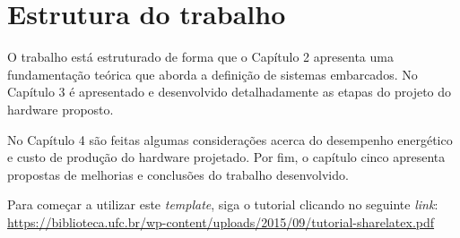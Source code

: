 \section{Estrutura do trabalho}

O trabalho está estruturado de forma que o Capítulo 2 apresenta uma fundamentação teórica que aborda a definição de sistemas embarcados. No Capítulo 3 é apresentado e desenvolvido detalhadamente as etapas do projeto do hardware proposto.

No Capítulo 4 são feitas algumas considerações acerca do desempenho energético e custo de produção do hardware projetado. Por fim, o capítulo cinco apresenta propostas de melhorias e conclusões do trabalho desenvolvido.
























Para começar a utilizar este \textit{template}, siga o tutorial clicando no seguinte \textit{link}:
\url{https://biblioteca.ufc.br/wp-content/uploads/2015/09/tutorial-sharelatex.pdf}

